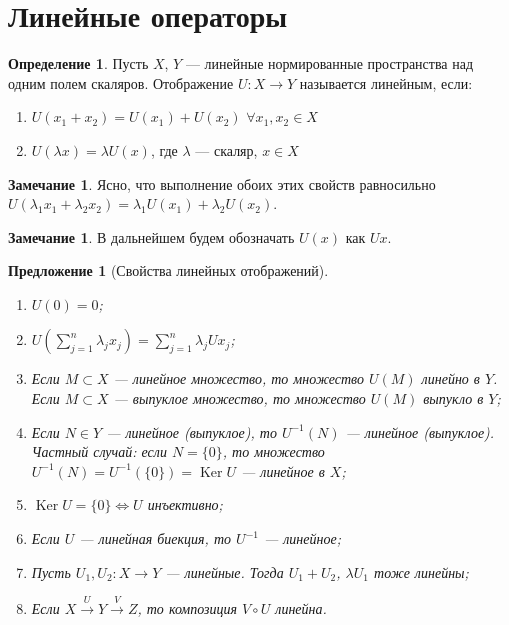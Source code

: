 \documentclass[11pt,openany,a4paper]{scrartcl}
\theoremstyle{plain}
\newtheorem{proposition}[theorem]{Предложение}
\theoremstyle{definition}
\newtheorem{definition}[theorem]{Определение}
\newtheorem{remark}[theorem]{Замечание}
\newcommand{\overto}[1]{\xrightarrow{#1}}
\DeclareMathOperator{\Ker}{Ker}
\begin{document}
\section{Линейные операторы}
\begin{definition}
    Пусть $X$, $Y$ — линейные нормированные пространства над одним полем скаляров.
    Отображение $U: X \to Y$ называется линейным, если:
    \begin{enumerate}
        \item $U(x_1+x_2) = U(x_1) + U(x_2)$ $\forall x_1, x_2 \in X$
        \item $U(\lambda x) = \lambda U(x)$, где $\lambda$ — скаляр, $x \in X$
    \end{enumerate}
\end{definition}
\begin{remark}
    Ясно, что выполнение обоих этих свойств равносильно
    $U(\lambda_1x_1 + \lambda_2x_2) = \lambda_1U(x_1) + \lambda_2U(x_2)$.
\end{remark}
\begin{remark}
    В дальнейшем будем обозначать $U(x)$ как $Ux$.
\end{remark}
\begin{proposition}[Свойства линейных отображений]
\mbox{}
    \begin{enumerate}
        \item $U(0) = 0$;
        \item $U(\sum\limits_{j=1}^n \lambda_j x_j) = \sum\limits_{j=1}^n
        \lambda_j Ux_j$;
        \item\label{image_linearity} Если $M \subset X$ — линейное множество,
        то множество
        $U(M)$ линейно в $Y$. Если $M \subset X$ — выпуклое множество,
        то множество $U(M)$ выпукло в $Y$;
        \item\label{preimage_linearity} Если $N \in Y$ — линейное (выпуклое),
        то $U^{-1}(N)$ — линейное (выпуклое). Частный случай: если $N = \{0\}$, то множество
        $U^{-1}(N) = U^{-1}(\{0\}) = \Ker U$ — линейное в $X$;
        \item $\Ker U = \{0\} \iff U$ инъективно;
        \item\label{inverse_linearity} Если $U$ — линейная биекция, то
        $U^{-1}$ — линейное;
        \item Пусть $U_1, U_2: X \to Y$ — линейные. Тогда $U_1 + U_2$,
        $\lambda U_1$ тоже линейны;
        \item Если $X \overto{U} Y \overto{V} Z$, то композиция $V\circ U$
        линейна.
    \end{enumerate}
\end{proposition}
\end{document}
